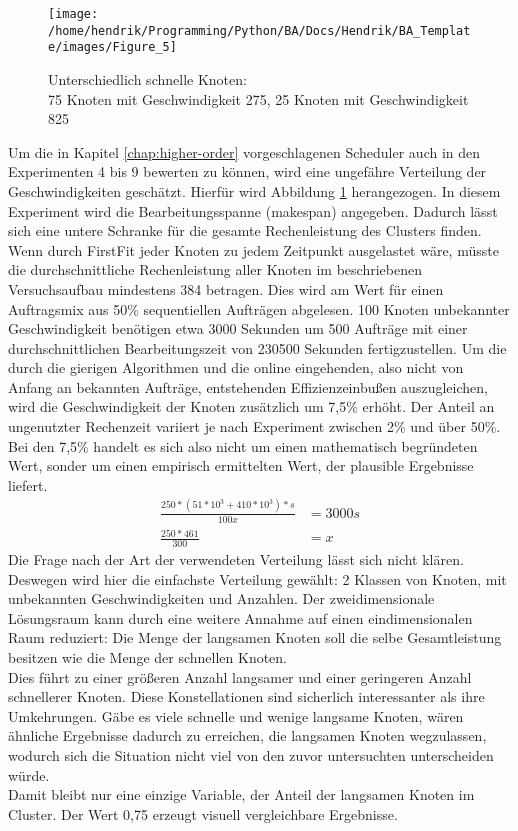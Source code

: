 \begin{figure}
	\centering
	\texttt{[image: /home/hendrik/Programming/Python/BA/Docs/Hendrik/BA\_Template/images/Figure\_5]}
	\caption{Unterschiedlich schnelle Knoten:\\
	75 Knoten mit Geschwindigkeit 275, 25 Knoten mit Geschwindigkeit 825}
	\label{figure5}
\end{figure}

Um die in Kapitel \ref{chap:higher-order} vorgeschlagenen Scheduler auch in den Experimenten 4 bis 9 bewerten zu können, wird eine ungefähre Verteilung der Geschwindigkeiten geschätzt.
Hierfür wird Abbildung \ref{figure5} herangezogen. In diesem Experiment wird die Bearbeitungsspanne (makespan) angegeben. Dadurch lässt sich eine untere Schranke für die gesamte Rechenleistung des Clusters finden. Wenn durch FirstFit jeder Knoten zu jedem Zeitpunkt ausgelastet wäre, müsste die durchschnittliche Rechenleistung aller Knoten im beschriebenen Versuchsaufbau mindestens 384 betragen. Dies wird am Wert für einen Auftragsmix aus 50\% sequentiellen Aufträgen abgelesen. 100 Knoten unbekannter Geschwindigkeit benötigen etwa 3000 Sekunden um 500 Aufträge mit einer durchschnittlichen Bearbeitungszeit von 230500 Sekunden fertigzustellen. Um die durch die gierigen Algorithmen und die online eingehenden, also nicht von Anfang an bekannten Aufträge, entstehenden Effizienzeinbußen auszugleichen, wird die Geschwindigkeit der Knoten zusätzlich um 7,5\% erhöht. Der Anteil an ungenutzter Rechenzeit variiert je nach Experiment zwischen 2\% und über 50\%. Bei den 7,5\% handelt es sich also nicht um einen mathematisch begründeten Wert, sonder um einen empirisch ermittelten Wert, der plausible Ergebnisse liefert.
\begin{align*}
\frac{250*(51* 10^3 + 410*10^3)*s}{100x} &= 3000s \\
\frac{250*461}{300} &= x
\end{align*}
Die Frage nach der Art der verwendeten Verteilung lässt sich nicht klären. Deswegen wird hier die einfachste Verteilung gewählt: 2 Klassen von Knoten, mit unbekannten Geschwindigkeiten und Anzahlen. Der zweidimensionale Lösungsraum kann durch eine weitere Annahme auf einen eindimensionalen Raum reduziert: Die Menge der langsamen Knoten soll die selbe Gesamtleistung besitzen wie die Menge der schnellen Knoten.\\
Dies führt zu einer größeren Anzahl langsamer und einer geringeren Anzahl schnellerer Knoten. Diese Konstellationen sind sicherlich interessanter als ihre Umkehrungen. Gäbe es viele schnelle und wenige langsame Knoten, wären ähnliche Ergebnisse dadurch zu erreichen, die langsamen Knoten wegzulassen, wodurch sich die Situation nicht viel von den zuvor untersuchten unterscheiden würde.\\
Damit bleibt nur eine einzige Variable, der Anteil der langsamen Knoten im Cluster. Der Wert 0,75 erzeugt visuell vergleichbare Ergebnisse.

